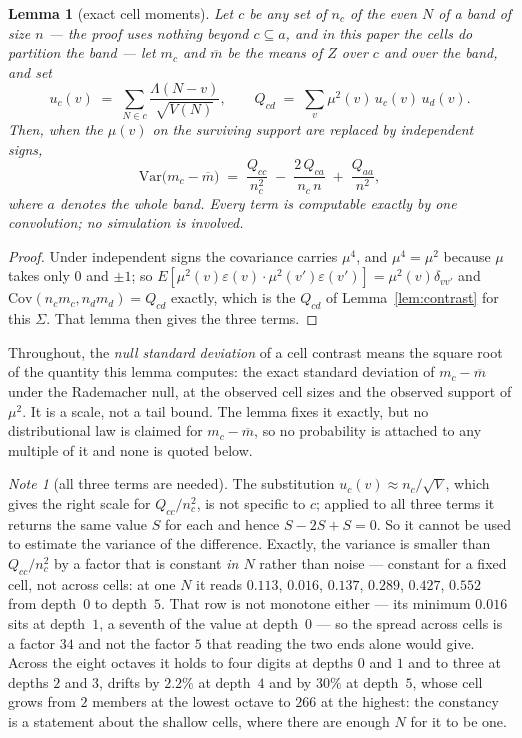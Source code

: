 \documentclass[11pt,a4paper]{article}
\theoremstyle{plain}
\newtheorem{lemma}[theorem]{Lemma}
\theoremstyle{definition}
\theoremstyle{remark}
\newtheorem{note}[theorem]{Note}
\begin{document}
\begin{lemma}[exact cell moments]\label{lem:cellmom}
Let $c$ be any set of $n_c$ of the even $N$ of a band of size $n$ ---
the proof uses nothing beyond $c\subseteq a$, and in this paper the
cells do partition the band --- let $m_c$ and $\overline m$ be
the means of $Z$ over $c$ and over the band, and set
\[
  u_c(v)\;=\;\sum_{N\in c}\frac{\Lambda(N-v)}{\sqrt{V(N)}},
  \qquad
  Q_{cd}\;=\;\sum_v\mu^2(v)\,u_c(v)\,u_d(v).
\]
Then, when the $\mu(v)$ on the surviving support are replaced by
independent signs,
\begin{equation}\label{eq:cellmom}
  \mathrm{Var}\bigl(m_c-\overline m\bigr)
  \;=\;\frac{Q_{cc}}{n_c^{2}}
  \;-\;\frac{2\,Q_{ca}}{n_c\,n}
  \;+\;\frac{Q_{aa}}{n^{2}},
\end{equation}
where $a$ denotes the whole band. Every term is computable exactly by
one convolution; no simulation is involved.
\end{lemma}

\begin{proof}
Under independent signs the covariance carries $\mu^4$, and $\mu^4=\mu^2$
because $\mu$ takes only $0$ and $\pm1$; so
$E[\mu^2(v)\varepsilon(v)\cdot\mu^2(v')\varepsilon(v')]
 =\mu^2(v)\delta_{vv'}$ and
$\mathrm{Cov}(n_cm_c,n_dm_d)=Q_{cd}$ exactly, which is the $Q_{cd}$ of
Lemma~\ref{lem:contrast} for this $\Sigma$. That lemma then gives the
three terms.
\end{proof}

Throughout, the \emph{null standard deviation} of a cell contrast means
the square root of the quantity this lemma computes: the exact standard
deviation of $m_c-\overline m$ under the Rademacher null, at the
observed cell sizes and the observed support of $\mu^2$. It is a scale,
not a tail bound. The lemma fixes it exactly, but no distributional law
is claimed for $m_c-\overline m$, so no probability is attached to any
multiple of it and none is quoted below.

\begin{note}[all three terms are needed]\label{note:threeterms}
The substitution $u_c(v)\approx n_c/\sqrt V$, which gives the right
scale for $Q_{cc}/n_c^2$, is not specific to $c$; applied to all three
terms it returns the same value $S$ for each and hence $S-2S+S=0$. So
it cannot be used to estimate the variance of the difference. Exactly,
the variance is smaller than $Q_{cc}/n_c^2$ by a factor that is
constant \emph{in $N$} rather than noise --- constant for a fixed
cell, not across cells: at one $N$ it reads $0.113$, $0.016$, $0.137$,
$0.289$, $0.427$, $0.552$ from depth~$0$ to depth~$5$. That row is not
monotone either --- its minimum $0.016$ sits at depth~$1$, a seventh of
the value at depth~$0$ --- so the spread across cells is a factor $34$
and not the factor $5$ that reading the two ends alone would give.
Across the eight octaves it holds to four
digits at depths $0$ and $1$ and to three at depths $2$ and $3$,
drifts by $2.2\%$ at depth~$4$ and by
$30\%$ at depth~$5$, whose cell grows from $2$ members at the lowest
octave to $266$ at the highest: the
constancy is a statement about the shallow cells, where there are
enough $N$ for it to be one.
\end{note}
\end{document}
